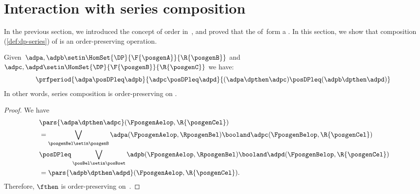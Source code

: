 
\section{Interaction with series composition}
In the previous section, we introduced the concept of order in~\DP, and proved that the  of~\DP form a .
In this section, we show that composition (\cref{def:dp-series}) of  is an order-preserving operation.

\begin{lemma}
    \label{lem:series_pres_order}
    Given~$\adpa,\adpb \setin \HomSet{\DP}{\F{\posgenA}}{\R{\posgenB}}$ and~$\adpc,\adpd \setin \HomSet{\DP}{\F{\posgenB}}{\R{\posgenC}}$ we have:
    \begin{equation}
        \prfperiod{
            \adpa\posDPleq \adpb
        }{
            \adpc\posDPleq \adpd
        }{
            (\adpa\dpthen \adpc) \posDPleq (\adpb\dpthen \adpd)
        }
    \end{equation}
    In other words, series composition is order-preserving on \DP.
\end{lemma}
\begin{proof}
    We have
    \begin{equation}
        \label{eq:series_pres_ord}
        \begin{aligned}
            ~ & \pars{ \adpa\dpthen \adpc}(\FposgenAelop,\R{\posgenCel}) \\
              & = \bigvee_{\posgenBel\setin \posgenB}\adpa(\FposgenAelop,\RposgenBel)\booland \adpc(\FposgenBelop,\R{\posgenCel}) \\
              & \posDPleq \bigvee_{\posBel\setin \posBset} \adpb(\FposgenAelop,\RposgenBel)\booland \adpd(\FposgenBelop,\R{\posgenCel}) \\
              & =\pars{ \adpb\dpthen \adpd}(\FposgenAelop,\R{\posgenCel}).
        \end{aligned}
    \end{equation}
    Therefore, $\fthen$ is order-preserving on~\DP.
\end{proof}

